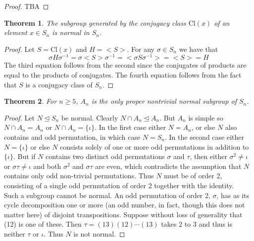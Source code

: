 \documentclass[a4paper,10pt]{article}
\newtheorem{theorem}{Theorem}
\begin{document}
\begin{proof}
TBA
\end{proof}

\begin{theorem}
The subgroup generated by the conjugacy class $\textrm{Cl}(x)$ of an element $x \in S_n$ is normal in $S_n$.   
\end{theorem}
\begin{proof}
Let $S = \textrm{Cl}(x)$ and $H = <S>$. For any $\sigma\in S_n$ we have that
\begin{equation}
\sigma H \sigma^{-1} = \sigma <S> \sigma^{-1} = <\sigma S \sigma^{-1}> = <S> = H 
\end{equation}
The third equation follows from the second since the conjugates of products are equal to the products of conjugates. The fourth equation follows from the fact that $S$ is a conjugacy class of $S_n$.
\end{proof}

\begin{theorem}
For $n \geq 5$, $A_n$ is the only proper nontrivial normal subgroup of $S_n$. 
\end{theorem}
\begin{proof}
Let $N \unlhd S_n$ be normal. Clearly $N\cap A_n \unlhd A_n$. But $A_n$ is simple so $N\cap A_n = A_n$ or $N\cap A_n = \{\iota\}$. In the first case either $N=A_n$, or else $N$ also contains and odd permutation, in which case $N=S_n$. In the second case either $N=\{\iota\}$ or else $N$ consists solely of one or more odd permutations in addition to $\{\iota\}$. But if $N$ contains two distinct odd permutations $\sigma$ and $\tau$, then either $\sigma^2 \neq \iota$ or $\sigma \tau \neq \iota$ and both $\sigma^2$ and $\sigma \tau$ are even, which contradicts the assumption that $N$ contains only odd non-trivial permutations. Thus $N$ must be of order 2, consisting of a single odd permutation of order 2 together with the identity. \\

Such a subgroup cannot be normal. An odd permutation of order 2, $\sigma$, has as its cycle decomposition one or more (an odd number, in fact, though this does not matter here) of disjoint transpositions. Suppose without loss of generality that (12) is one of these. Then $\tau = (13)(12)\cdots(13)$ takes 2 to 3 and thus is neither $\tau$ or $\iota$. Thus $N$ is not normal.
\end{proof}
\end{document}
